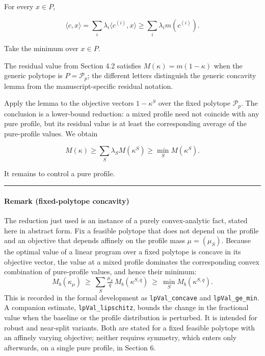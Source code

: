 \documentclass[
  american,
  11pt,
  a4paper,
]{article}
\begin{document}
For every \(x\in P\),

\[
\langle c,x\rangle
=
\sum_i\lambda_i\langle c^{(i)},x\rangle
\ge
\sum_i\lambda_i m(c^{(i)}).
\]

Take the minimum over \(x\in P\).

The residual value from Section 4.2 satisfies \(M(\kappa)=m(1-\kappa)\) when the generic polytope is \(P=\mathcal P_p\); the different letters distinguish the generic concavity lemma from the manuscript-specific residual notation.

Apply the lemma to the objective vectors \(1-\kappa^S\) over the fixed polytope \(\mathcal P_p\). The conclusion is a lower-bound reduction: a mixed profile need not coincide with any pure profile, but its residual value is at least the corresponding average of the pure-profile values. We obtain

\[
\boxed{
M(\kappa)
\ge
\sum_S\lambda_SM(\kappa^S)
\ge
\min_SM(\kappa^S).
}
\tag{5.4}
\]

It remains to control a pure profile.

\begin{center}\rule{0.5\linewidth}{0.5pt}\end{center}

\paragraph{Remark (fixed-polytope concavity)}\label{remark-fixed-polytope-concavity}

The reduction just used is an instance of a purely convex-analytic fact, stated here in abstract form. Fix a feasible polytope that does not depend on the profile and an objective that depends affinely on the profile mass \(\mu=(\mu_S)\). Because the optimal value of a linear program over a fixed polytope is concave in its objective vector, the value at a mixed profile dominates the corresponding convex combination of pure-profile values, and hence their minimum:
\[
M_b(\kappa_\mu)\ \ge\ \sum_S \tfrac{\mu_S}{q}\,M_b(\kappa^{S,q})\ \ge\ \min_S M_b(\kappa^{S,q}).
\]
This is recorded in the formal development as \texttt{lpVal\_concave} and \texttt{lpVal\_ge\_min}. A companion estimate, \texttt{lpVal\_lipschitz}, bounds the change in the fractional value when the baseline or the profile distribution is perturbed. It is intended for robust and near-split variants. Both are stated for a fixed feasible polytope with an affinely varying objective; neither requires symmetry, which enters only afterwards, on a single pure profile, in Section 6.
\end{document}
